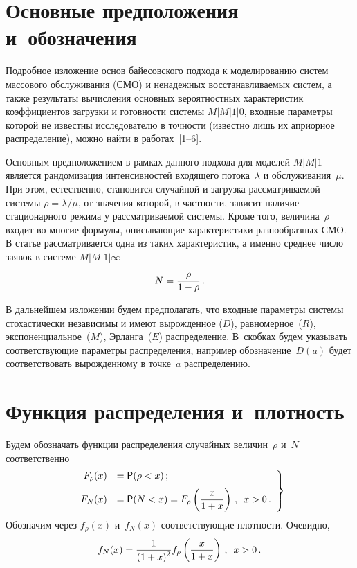       \begin{multicols}{2}

      \label{st\stat}


\section{Основные предположения и~обозначения}

Подробное изложение основ байесовского подхода к моделированию систем массового обслуживания (СМО) и ненадежных
восстанавливаемых систем, а также результаты вычисления основных вероятностных характеристик коэффициентов
загрузки и готовности системы $M|M|1|0$, входные параметры которой не известны исследователю в точности (известно лишь их
априорное распределение), можно найти в работах~[1--6].

Основным предположением в рамках данного подхода для моделей $M|M|1$ является рандомизация интенсивностей входящего
потока~$\lambda$ и обслуживания~$\mu$. При этом, естественно, становится случайной и загрузка рассматриваемой системы
$\rho=\lambda/\mu$, от значения которой, в частности, зависит наличие стационарного режима у рассматриваемой системы.
Кроме того, величина~$\rho$ входит во многие формулы, описывающие характеристики разнообразных СМО.
В статье рассматривается одна из таких характеристик, а именно среднее число заявок в системе  $M|M|1|\infty$
$$
N=\displaystyle\frac{\displaystyle \rho\mathstrut}{\displaystyle 1-\rho\mathstrut}\,.
$$

В дальнейшем изложении будем предполагать, что входные параметры системы стохастически независимы и имеют вырожденное
($D$), равномерное~($R$), экспоненциальное~($M$), Эрланга~($E$) распределение. В~скобках будем указывать
соответствующие параметры распределения, например обозначение~$D(a)$ будет соответствовать вырожденному в точке~$a$
распределению.

\section{Функция распределения и~плотность}

Будем обозначать функции распределения случайных величин~$\rho$ и~$N$ соответственно
\begin{equation}
\left.
\begin{array}{rl}
F_\rho(x)&={\sf P}(\rho<x)\,;\\[6pt]
 F_N(x)&={\sf P}(N<x)=F_\rho\left( \displaystyle\frac{\displaystyle x\mathstrut}{\displaystyle 1+x\mathstrut}\right)\,,\enskip x>0\,.
 \end{array}
 \right \}
\label{e1sh}
\end{equation}
Обозначим через $f_\rho(x)$ и~$f_N(x)$ соответствующие плотности. Очевидно,
\begin{equation}
f_N(x)=\displaystyle\frac{\displaystyle 1\mathstrut}{\displaystyle (1+x)^2\mathstrut}f_\rho\left(\displaystyle\frac{\displaystyle x\mathstrut}{\displaystyle 1+x\mathstrut}\right)\,,\enskip x>0\,.
\label{e2sh}
\end{equation}


\end{multicols}
